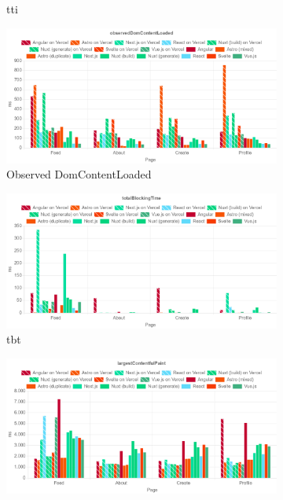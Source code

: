 \documentclass[a4paper, 12pt]{article}
\begin{document}
\begin{figure}[!h]
\begin{subfigure}{0.49\linewidth}
\begin{center}
    \end{center}
    \caption{\acrfull{tti}}\label{subfig:LH:interactive}
  \end{subfigure}
  \begin{subfigure}{0.49\linewidth}
    \begin{center}
      \includegraphics[width=\linewidth, keepaspectratio]{img/lighthouse-results/observedDomContentLoaded.png}
    \end{center}
    \caption{Observed DomContentLoaded}\label{subfig:LH:observedDomContentLoaded}
  \end{subfigure}
  \begin{subfigure}{0.49\linewidth}
    \begin{center}
      \includegraphics[width=\linewidth, keepaspectratio]{img/lighthouse-results/TBT.png}
    \end{center}
    \caption{\acrfull{tbt}}\label{subfig:LH:totalBlockingTime}
  \end{subfigure}
  \begin{subfigure}{0.49\linewidth}
    \begin{center}
      \includegraphics[width=\linewidth, keepaspectratio]{img/lighthouse-results/LCP.png}

\end{center}
\end{subfigure}
\end{figure}
\end{document}
